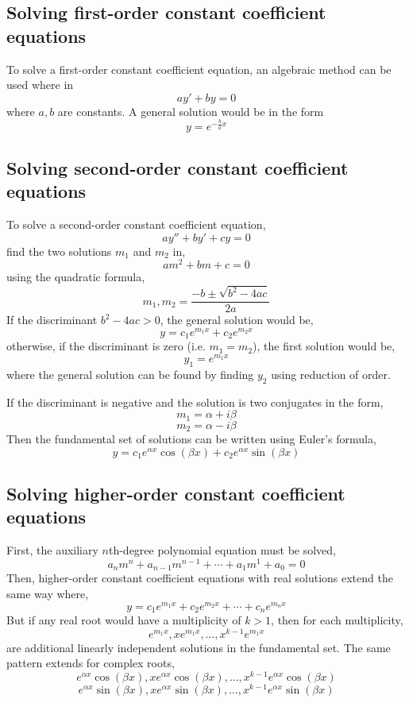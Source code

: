 \subsection{Solving first-order constant coefficient equations}

To solve a first-order constant coefficient equation, an algebraic method can be used where in
\[
    ay' + by = 0
\]
where $a,b$ are constants. A general solution would be in the form
\[
    y = e^{-\frac{b}{a}x}
\]

\subsection{Solving second-order constant coefficient equations}

To solve a second-order constant coefficient equation,
\[
    ay'' + by' + cy = 0
\]
find the two solutions $m_1$ and $m_2$ in,
\[
    am^2 + bm + c = 0
\]
using the quadratic formula,
\[
    m_1, m_2 = \frac{-b \pm \sqrt{b^2 - 4ac}}{2a}
\]
If the discriminant $b^2 - 4ac > 0$, the general solution would be,
\[
    y = c_1 e^{m_1 x} + c_2 e^{m_2 x}
\]
otherwise, if the discriminant is zero (i.e. $m_1 = m_2$), the first solution would be,
\[
    y_1 = e^{m_1 x}
\]
where the general solution can be found by finding $y_2$ using reduction of order.

If the discriminant is negative and the solution is two conjugates in the form,
\[
    m_1 = \alpha + i\beta
\]
\[
    m_2 = \alpha - i\beta
\]
Then the fundamental set of solutions can be written using Euler's formula,
\[
    y = c_1 e^{\alpha x} \cos(\beta x) + c_2 e^{\alpha x} \sin(\beta x)
\]

\subsection{Solving higher-order constant coefficient equations}

First, the auxiliary $n$th-degree polynomial equation must be solved,
\[
    a_n m^n + a_{n - 1} m^{n - 1} + \cdots + a_1 m^1 + a_0 = 0
\]
Then, higher-order constant coefficient equations with real solutions extend the same way where,
\[
    y = c_1 e^{m_1 x} + c_2 e^{m_2 x} + \cdots + c_n e^{m_n x}
\]
But if any real root would have a multiplicity of $k > 1$, then for each multiplicity,
\[
    e^{m_1 x}, xe^{m_1 x}, \ldots, x^{k - 1}e^{m_1 x}
\]
are additional linearly independent solutions in the fundamental set. The same pattern extends for complex roots,
\[
    e^{\alpha x} \cos(\beta x), xe^{\alpha x} \cos(\beta x), \ldots, x^{k - 1}e^{\alpha x} \cos(\beta x)
\]
\[
    e^{\alpha x} \sin(\beta x), xe^{\alpha x} \sin(\beta x), \ldots, x^{k - 1}e^{\alpha x} \sin(\beta x)
\]

